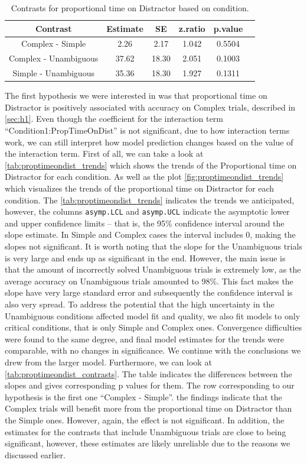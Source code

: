 \begin{table}[h!]
\centering
\begin{tabular}{|c|c|c|c|c|c|}
\hline
\textbf{Contrast} & \textbf{Estimate} & \textbf{SE} & \textbf{z.ratio} & \textbf{p.value} \\ \hline
Complex - Simple & 2.26 & 2.17 & 1.042 & 0.5504 \\ \hline
Complex - Unambiguous & 37.62 & 18.30 & 2.051 & 0.1003 \\ \hline
Simple - Unambiguous & 35.36 & 18.30 & 1.927 & 0.1311 \\ \hline
\end{tabular}
\caption{Contrasts for proportional time on Distractor based on condition.}
\label{tab:proptimeondist_contrasts}
\end{table}

The first hypothesis we were interested in was that proportional time on Distractor is positively associated with accuracy on Complex trials, described in \autoref{sec:h1}. Even though the coefficient for the interaction term ``Condition1:PropTimeOnDist'' is not significant, due to how interaction terms work, we can still interpret how model prediction changes based on the value of the interaction term. First of all, we can take a look at \autoref{tab:proptimeondist_trends} which shows the trends of the Proportional time on Distractor for each condition. As well as the plot \autoref{fig:proptimeondist_trends} which visualizes the trends of the proportional time on Distractor for each condition. The \autoref{tab:proptimeondist_trends} indicates the trends we anticipated, however, the columns \texttt{asymp.LCL} and \texttt{asymp.UCL} indicate the asymptotic lower and upper confidence limits -- that is, the 95\% confidence interval around the slope estimate. In Simple and Complex cases the interval includes 0, making the slopes not significant. It is worth noting that the slope for the Unambiguous trials is very large and ends up as significant in the end. However, the main issue is that the amount of incorrectly solved Unambiguous trials is extremely low, as the average accuracy on Unambiguous trials amounted to 98\%. This fact makes the slope have very large standard error and subsequently the confidence interval is also very spread. To address the potential that the high uncertainty in the Unambiguous conditions affected model fit and quality, we also fit models to only critical conditions, that is only Simple and Complex ones. Convergence difficulties were found to the same degree, and final model estimates for the trends were comparable, with no changes in significance. We continue with the conclusions we drew from the larger model.
Furthermore, we can look at \autoref{tab:proptimeondist_contrasts}. The table indicates the differences between the slopes and gives corresponding p values for them. The row corresponding to our hypothesis is the first one ``Complex - Simple''. the findings indicate that the Complex trials will benefit more from the proportional time on Distractor than the Simple ones. However, again, the effect is not significant. In addition, the estimates for the contrasts that include Unambiguous trials are close to being significant, however, these estimates are likely unreliable due to the reasons we discussed earlier.

